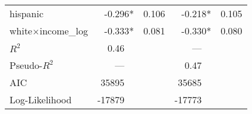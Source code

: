 \begin{tabular}{l r r r r}
	hispanic                 & -0.296*          & 0.106 & -0.218*           & 0.105 \\
	white$\times$income\_log & -0.333*          & 0.081 & -0.330*           & 0.080 \\ 
	\midrule
	$R^2$                    & 0.46~~           &       & ---~~             &       \\
	Pseudo-$R^2$             & ---~~            &       & 0.47~~            &       \\
	AIC                      & 35895~~          &       & 35685~~           &       \\
	Log-Likelihood           & -17879~~         &       & -17773~~          &       \\ 
	\bottomrule
\end{tabular}